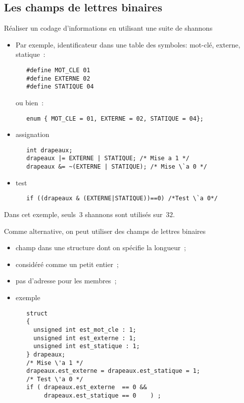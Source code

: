 \begin{frame}[fragile]
    \section{Les champs de lettres binaires}
 R\'ealiser un codage d'informations en utilisant une suite de shannons
\begin{itemize}
\item Par exemple, identificateur dans une table des symboles:
  mot-cl\'e, externe, statique~:
\begin{verbatim}
   #define MOT_CLE 01
   #define EXTERNE 02
   #define STATIQUE 04
\end{verbatim}
ou bien~:
\begin{verbatim}
   enum { MOT_CLE = 01, EXTERNE = 02, STATIQUE = 04};
\end{verbatim}
  \item assignation
{\normalsize
\begin{verbatim}
   int drapeaux;
   drapeaux |= EXTERNE | STATIQUE; /* Mise a 1 */
   drapeaux &= ~(EXTERNE | STATIQUE); /* Mise \`a 0 */
\end{verbatim}
}
  \item test
{\normalsize
\begin{verbatim}
   if ((drapeaux & (EXTERNE|STATIQUE))==0) /*Test \`a 0*/
\end{verbatim}
}
\end{itemize}
\par\medskip
Dans cet exemple, seuls~$3$ shannons sont utilis\'es sur~$32$.
\end{frame}
\begin{frame}[fragile]
Comme alternative, on peut utiliser des champs de lettres binaires 
\begin{itemize}
  \item champ dans une structure dont on sp\'ecifie la longueur~;
  \item consid\'er\'e comme un petit entier~;
  \item pas d'adresse pour les membres~;
  \item exemple
\begin{verbatim}
   struct 
   {
     unsigned int est_mot_cle : 1;
     unsigned int est_externe : 1;
     unsigned int est_statique : 1;
   } drapeaux;
   /* Mise \'a 1 */
   drapeaux.est_externe = drapeaux.est_statique = 1; 
   /* Test \'a 0 */
   if ( drapeaux.est_externe  == 0 && 
        drapeaux.est_statique == 0    ) ;
\end{verbatim}
\end{itemize}
\end{frame}
